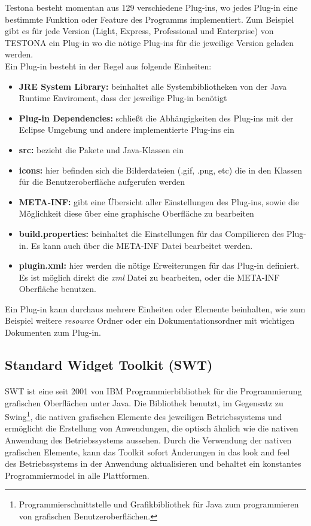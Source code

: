Testona besteht momentan aus 129 verschiedene Plug-ins, wo jedes Plug-in eine bestimmte Funktion oder Feature des Programms implementiert. Zum Beispiel gibt es für jede Version (Light, Express, Professional und Enterprise) von TESTONA ein Plug-in wo die nötige Plug-ins für die jeweilige Version geladen werden.\\

Ein Plug-in besteht in der Regel aus folgende Einheiten:

\begin{itemize}
\item \textbf{JRE System Library:} beinhaltet alle Systembibliotheken von der Java Runtime Enviroment, dass der jeweilige Plug-in benötigt
\item \textbf{Plug-in Dependencies:} schließt die Abhängigkeiten des Plug-ins mit der Eclipse Umgebung und andere implementierte Plug-ins ein
\item \textbf{src:} bezieht die Pakete und Java-Klassen ein
\item \textbf{icons:} hier befinden sich die Bilderdateien (.gif, .png, etc) die in den Klassen für die Benutzeroberfläche  aufgerufen werden
\item \textbf{META-INF:} gibt eine Übersicht aller Einstellungen des Plug-ins, sowie die Möglichkeit diese über eine graphische Oberfläche zu bearbeiten
\item \textbf{build.properties:} beinhaltet die Einstellungen für das Compilieren des Plug-in. Es kann auch über die META-INF Datei bearbeitet werden.
\item \textbf{plugin.xml:} hier werden die nötige Erweiterungen für das Plug-in definiert. Es ist möglich direkt die \textit{xml} Datei zu bearbeiten, oder die META-INF Oberfläche benutzen.
\end{itemize}

Ein Plug-in kann durchaus mehrere Einheiten oder Elemente beinhalten, wie zum Beispiel weitere \textit{resource} Ordner oder ein Dokumentationsordner mit wichtigen Dokumenten zum Plug-in.
\subsection{Standard Widget Toolkit (SWT)}
\paragraph{}
SWT ist eine seit 2001 von IBM Programmierbibliothek für die Programmierung grafischen Oberflächen unter Java. Die Bibliothek benutzt, im Gegensatz zu Swing\footnote{Programmierschnittstelle und Grafikbibliothek für Java zum programmieren von grafischen Benutzeroberflächen.}, die nativen grafischen Elemente des jeweiligen Betriebssystems und ermöglicht die Erstellung von Anwendungen, die optisch ähnlich wie die nativen Anwendung des Betriebssystems aussehen. Durch die Verwendung der nativen grafischen Elemente, kann das Toolkit sofort Änderungen in das \glqq look and feel\grqq~ des Betriebssystems in der Anwendung aktualisieren und behaltet ein konstantes Programmiermodel in alle Plattformen.
\cite{EclipseSWT}\\

